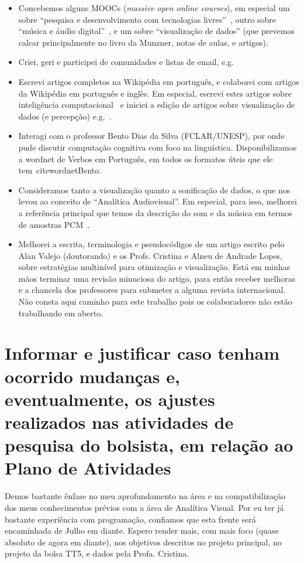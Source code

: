 \documentclass[a4paper, 11pt]{article}
\begin{document}
\begin{itemize}
  \item Concebemos alguns MOOCs (\emph{massive open online courses}), em especial um sobre ``pesquisa e desenvolvimento com tecnologias livres''~\cite{tecl}, outro sobre ``música e áudio digital''~\cite{mus}, e um sobre ``visualização de dados'' (que prevemos calcar principalmente no livro da Munzner, notas de aulas, e artigos).
  \item Criei, geri e participei de comunidades e listas de email, e.g.~\cite{vimUse,fvim,fpln,fic,frc}
  \item Escrevi artigos completos na Wikipédia em português, e colaborei com artigos da Wikipédia em português e inglês. Em especial, escrevi estes artigos sobre inteligência computacional~\cite{wic,wsd,wib,wpe,wpo,wed,wsi,wcc,wce} e iniciei a edição de artigos sobre visualização de dados (e percepção) e.g.~\cite{wvd}.
  \item Interagi com o professor Bento Dias da Silva (FCLAR/UNESP), por onde pude discutir computação cognitiva com foco na linguística. Disponibilizamos a wordnet de Verbos em Português, em todos os formatos úteis que ele tem~cite{wordnetBento}.
  \item Consideramos tanto a visualização quanto a sonificação de dados, o que nos levou ao conceito de ``Analítica Audiovisual''. Em especial, para isso, melhorei a referência principal que temos da descrição do som e da música em termos de amostras PCM~\cite{arxiv}.
  \item Melhorei a escrita, terminologia e pseudocódigos de um artigo escrito pelo Alan Valejo (doutorando) e os Profs. Cristina e Alneu de Andrade Lopes, sobre estratégias multinível para otimização e visualização. Está em minhas mãos terminar uma revisão minuciosa do artigo, para então receber melhoras e a chancela dos professores para submeter a alguma revista internacional. Não consta aqui caminho para este trabalho pois os colaboradores não estão trabalhando em aberto.
\end{itemize}

\section{Informar e justificar caso tenham ocorrido mudanças e, eventualmente, os ajustes realizados nas atividades de pesquisa do bolsista, em relação ao Plano de Atividades}
Demos bastante ênfase no meu aprofundamento na área e na compatibilização dos meus conhecimentos prévios com a área de Analítica Visual.
Por eu ter já bastante experiência com programação, confiamos que esta frente será encaminhada de Julho em diante.
Espero render mais, com mais foco (quase absoluto de agora em diante), nos objetivos descritos no projeto principal,
no projeto da bolsa TT5, e dados pela Profa. Cristina.
\end{document}
